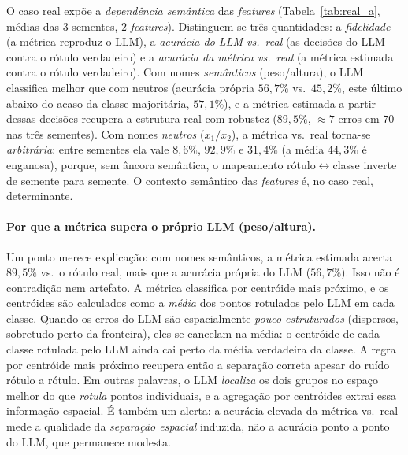 \documentclass[12pt,a4paper]{article}
\begin{document}
O caso real expõe a \emph{dependência semântica} das \emph{features}
(Tabela~\ref{tab:real_a}, médias das $3$ sementes, $2$ \emph{features}). Distinguem-se três
quantidades: a \emph{fidelidade} (a métrica reproduz o LLM), a \emph{acurácia do LLM vs.\
real} (as decisões do LLM contra o rótulo verdadeiro) e a \emph{acurácia da métrica vs.\
real} (a métrica estimada contra o rótulo verdadeiro). Com nomes \emph{semânticos}
(peso/altura), o LLM classifica melhor que com neutros (acurácia própria $56{,}7\%$ vs.\
$45{,}2\%$, este último abaixo do acaso da classe majoritária, $57{,}1\%$), e a métrica
estimada a partir dessas decisões recupera a estrutura real com robustez ($89{,}5\%$,
$\approx 7$ erros em $70$ nas três sementes). Com nomes \emph{neutros} ($x_1/x_2$), a métrica
vs.\ real torna-se \emph{arbitrária}: entre sementes ela vale $8{,}6\%$, $92{,}9\%$ e
$31{,}4\%$ (a média $44{,}3\%$ é enganosa), porque, sem âncora semântica, o mapeamento
rótulo$\leftrightarrow$classe inverte de semente para semente. O contexto semântico das
\emph{features} é, no caso real, determinante.

\paragraph{Por que a métrica supera o próprio LLM (peso/altura).}
Um ponto merece explicação: com nomes semânticos, a métrica estimada acerta $89{,}5\%$ vs.\
o rótulo real, mais que a acurácia própria do LLM ($56{,}7\%$). Isso não é contradição nem
artefato. A métrica classifica por centróide mais próximo, e os centróides são calculados
como a \emph{média} dos pontos rotulados pelo LLM em cada classe. Quando os erros do LLM são
espacialmente \emph{pouco estruturados} (dispersos, sobretudo perto da fronteira), eles se
cancelam na média: o centróide de cada classe rotulada pelo LLM ainda cai perto da média
verdadeira da classe. A regra por centróide mais próximo recupera então a separação correta
apesar do ruído rótulo a rótulo. Em outras palavras, o LLM \emph{localiza} os dois grupos no
espaço melhor do que \emph{rotula} pontos individuais, e a agregação por centróides extrai
essa informação espacial. É também um alerta: a acurácia elevada da métrica vs.\ real mede a
qualidade da \emph{separação espacial} induzida, não a acurácia ponto a ponto do LLM, que
permanece modesta.
\end{document}
